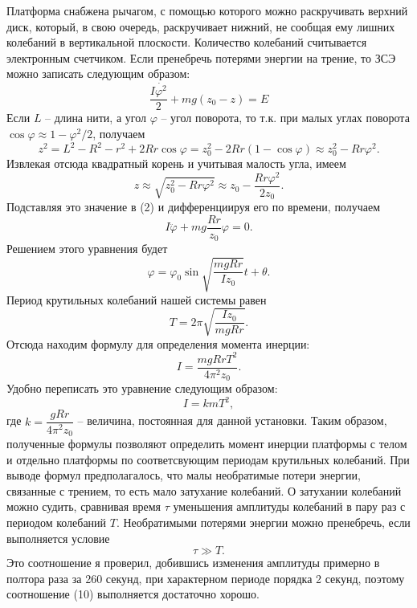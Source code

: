 \documentclass[a4paper, 12pt]{article}%
\begin{document}
Платформа снабжена рычагом, с помощью которого можно раскручивать верхний диск, который, в свою очередь, раскручивает нижний, не сообщая ему лишних колебаний в вертикальной плоскости. Количество колебаний считывается электронным счетчиком. Если пренебречь потерями энергии на трение, то ЗСЭ можно записать следующим образом:
\begin{equation}
\frac{I\dot{\varphi^2}}{2}+mg(z_0-z)=E
\end{equation}
Если $L$ -- длина нити, а угол $\varphi$ -- угол поворота, то т.к. при малых углах поворота $\cos{\varphi}\approx 1-\varphi^2/2$, получаем
\begin{equation}
z^2=L^2-R^2-r^2+2Rr\cos{\varphi}=z^2_0-2Rr(1-\cos{\varphi})\approx z^2_0-Rr\varphi^2.
\end{equation}
Извлекая отсюда квадратный корень и учитывая малость угла, имеем 
\begin{equation}
z\approx\sqrt{z^2_0-Rr\varphi^2}\approx z_0-\dfrac{Rr\varphi^2}{2z_0}.
\end{equation}
Подставляя это значение в (2) и дифференциируя его по времени, получаем
\begin{equation}
I\ddot{\varphi}+mg\frac{Rr}{z_0}\varphi=0.
\end{equation}
Решением этого уравнения будет
\begin{equation}
\varphi=\varphi_0\sin{\sqrt{\dfrac{mgRr}{Iz_0}}t+\theta}.
\end{equation}
Период крутильных колебаний нашей системы равен 
\begin{equation}
T=2\pi\sqrt{\dfrac{Iz_0}{mgRr}}.
\end{equation}
Отсюда находим формулу для определения момента инерции:
\begin{equation}
I=\dfrac{mgRrT^2}{4\pi^2z_0}.
\end{equation}
Удобно переписать это уравнение следующим образом:
\begin{equation}
I=kmT^2,
\end{equation}
где $k=\dfrac{gRr}{4\pi^2z_0}$ -- величина, постоянная для данной установки.
Таким образом, полученные формулы позволяют определить момент инерции платформы с телом и отдельно платформы по соответсвующим периодам крутильных колебаний. При выводе формул предполагалось, что малы необратимые потери энергии, связанные с трением, то есть мало затухание колебаний. О затухании колебаний можно судить, сравнивая время $\tau$ уменьшения амплитуды колебаний в пару раз с периодом колебаний $T$. Необратимыми потерями энергии можно пренебречь, если выполняется условие 
\begin{equation}
\tau\gg T.
\end{equation}
Это соотношение я проверил, добившись изменения амплитуды примерно в полтора раза за 260 секунд, при характерном периоде порядка 2 секунд, поэтому соотношение (10) выполняется достаточно хорошо.
\end{document}
